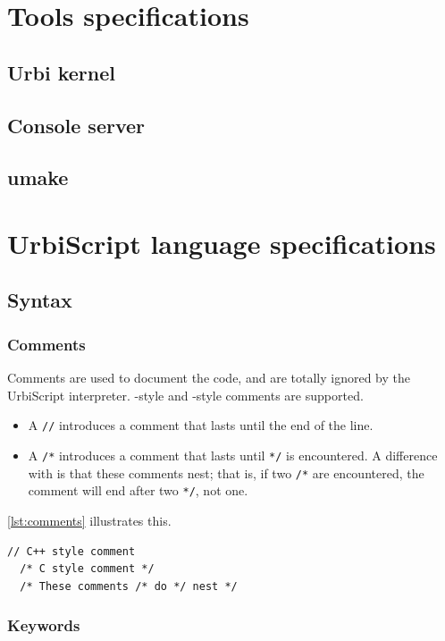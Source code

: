 \documentclass[openright,twoside,12pt]{report}
\newcommand{\urbi}{Urbi\xspace}
\newcommand{\umake}{umake\xspace}
\newcommand{\us}{UrbiScript\xspace}
\newcommand{\lst}[1]{\autoref{lst:#1}}
\begin{document}
\chapter{Tools specifications}

\section{\urbi kernel}
\section{Console server}
\section{\umake}

\chapter{\us language specifications}

\section{Syntax}
\subsection{Comments}

Comments are used to document the code, and are totally ignored by the
\us interpreter. \Cxx-style and \C-style comments are supported.

\begin{itemize}
\item A \lstinline|//| introduces a comment that lasts until the end
  of the line.
\item A \lstinline|/*| introduces a comment that lasts until
  \lstinline|*/| is encountered. A difference with \C is that these
  comments nest; that is, if two \lstinline|/*| are encountered, the
  comment will end after two \lstinline|*/|, not one.
\end{itemize}

\lst{comments} illustrates this.

\begin{lstlisting}[caption=Comments,label=lst:comments,float=htp]
  // C++ style comment
  /* C style comment */
  /* These comments /* do */ nest */
\end{lstlisting}

\subsection{Keywords}
\end{document}
